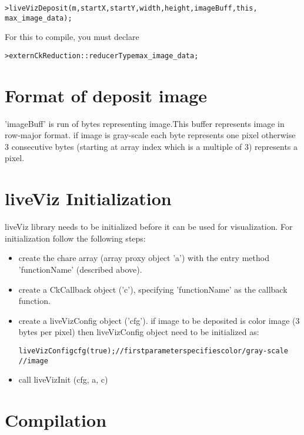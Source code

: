 \begin{alltt}
 > liveVizDeposit (m, startX, startY, width, height, imageBuff, this, 
                   max\_image\_data);
\end{alltt}

For this to compile, you must declare 

\begin{alltt}
 > extern CkReduction::reducerType max\_image\_data;
\end{alltt}

\section{Format of deposit image}

'imageBuff' is run of bytes representing image.This buffer represents image in 
row-major format. if image is gray-scale each byte represents one pixel 
otherwise 3 consecutive bytes (starting at array index which is a multiple of 3)
 represents a pixel.

\section{liveViz Initialization}

liveViz library needs to be initialized before it can be used for 
visualization. For initialization follow the following steps:
\begin{itemize}
\item create the chare array (array proxy object 'a') with the entry 
      method 'functionName' (described above).
\item create a CkCallback object ('c'), specifying 'functionName' as the 
      callback function.
\item create a liveVizConfig object ('cfg'). if image to be deposited is color 
      image (3 bytes per pixel) then liveVizConfig object need to be initialized
      as:
\begin{alltt}
          liveVizConfig cfg (true);// first parameter specifies color/gray-scale
                                   // image
\end{alltt}

\item call liveVizInit (cfg, a, c)
\end{itemize}

\section{Compilation}

